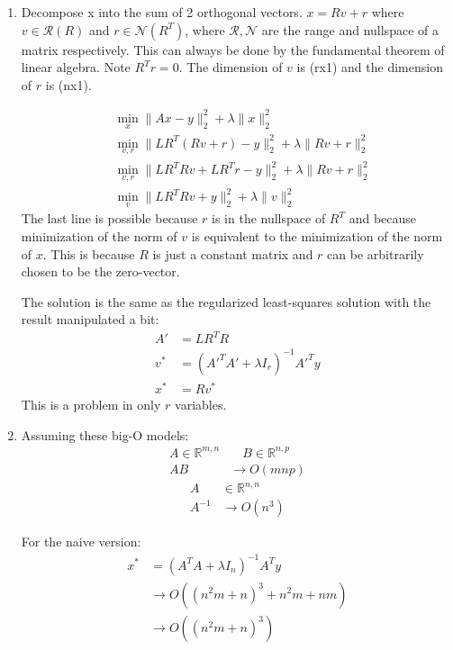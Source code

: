 \documentclass[11pt]{article}
\begin{document}
\begin{solution}
\begin{enumerate}
    \item Decompose x into the sum of 2 orthogonal vectors. $x = Rv + r$ where $v \in \mathcal{R}(R)$ and $r \in \mathcal{N}(R^T)$, where $\mathcal{R}, \mathcal{N}$ are the range and nullspace of a matrix respectively. This can always be done by the fundamental theorem of linear algebra. Note $R^T r = 0$. The dimension of $v$ is (rx1) and the dimension of $r$ is (nx1).

    \begin{align*}
        &\min_x \|Ax - y\|_2^2 + \lambda \|x\|_2^2 \\
        &\min_{v,r} \|L R^T (Rv + r) - y\|_2^2 + \lambda \|Rv + r\|_2^2 \\
        &\min_{v,r} \|L R^T R v + L R^T r - y\|_2^2 + \lambda \|Rv + r\|_2^2 \\
        &\min_{v} \|L R^T R v + y\|_2^2 + \lambda \|v\|_2^2
    \end{align*}
    The last line is possible because $r$ is in the nullspace of $R^T$ and because minimization of the norm of $v$ is equivalent to the minimization of the norm of $x$. This is because $R$ is just a constant matrix and $r$ can be arbitrarily chosen to be the zero-vector.

    The solution is the same as the regularized least-squares solution with the result manipulated a bit:
    \begin{align*}
        A' &= L R^T R \\
        v^* &= (A'^T A' + \lambda I_r)^{-1} A'^T y \\
        x^* &= R v^*
    \end{align*}
    This is a problem in only $r$ variables.

    \item Assuming these big-O models:
    \begin{align*}
        A \in \mathbb{R}^{m,n} &\quad B \in \mathbb{R}^{n,p} \\
        AB &\rightarrow O(mnp)
    \end{align*}
    \begin{align*}
        A &\in \mathbb{R}^{n,n} \\
        A^{-1} &\rightarrow O(n^3)
    \end{align*}

    For the naive version:
    \begin{align*}
        x^* &= (A^T A + \lambda I_n)^{-1} A^T y \\
        &\rightarrow O((n^2 m + n)^3 + n^2 m + nm) \\
        &\rightarrow O((n^2 m + n)^3)
    \end{align*}


\end{enumerate}
\end{solution}
\end{document}
